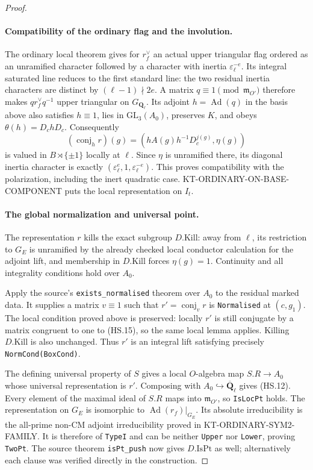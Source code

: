 \begin{proof}
\paragraph{Compatibility of the ordinary flag and the involution.}
The ordinary local theorem gives for $r_f^\vee$ an actual
upper triangular flag ordered as an unramified character
followed by a character with inertia
$\varepsilon_\ell^{-e}$.  Its integral saturated line
reduces to the first standard line: the two residual
inertia characters are distinct by
$(\ell-1)\nmid2e$.  A matrix $q\equiv1\pmod{\mathfrak m_{O'}}$
therefore makes $q r_f^\vee q^{-1}$ upper triangular
on $G_{\mathbf Q_\ell}$.  Its adjoint $h=\operatorname{Ad}(q)$
in the basis above also satisfies $h\equiv1$, lies in
$\mathrm{GL}_3(A_0)$, preserves $K$, and obeys
$\theta(h)=D_chD_c$.  Consequently
\[
 (\operatorname{conj}_h r)(g)
       =(hA(g)h^{-1}D_c^{j(g)},\eta(g))                     \tag{HS.15}
\]
is valued in $B\rtimes\{\pm1\}$ locally at $\ell$.
Since $\eta$ is unramified there, its diagonal inertia
character is exactly
$(\varepsilon_\ell^e,1,\varepsilon_\ell^{-e})$.
This proves compatibility with the polarization, including
the inert quadratic case.  KT-ORDINARY-ON-BASE-COMPONENT
puts the local representation on $I_t$.

\paragraph{The global normalization and universal point.}
The representation $r$ kills the exact subgroup
$D.\mathrm{Kill}$: away from $\ell$, its restriction to
$G_E$ is unramified by the already checked local conductor
calculation for the adjoint lift, and membership in
$D.\mathrm{Kill}$ forces $\eta(g)=1$.  Continuity and all
integrality conditions hold over $A_0$.

Apply the source's \texttt{exists\_normalised} theorem
over $A_0$ to the residual marked data.  It supplies a
matrix $v\equiv1$ such that $r'=\operatorname{conj}_v r$
is \texttt{Normalised} at $(c,g_1)$.  The local condition
proved above is preserved: locally $r'$ is still conjugate
by a matrix congruent to one to (HS.15), so the same local
lemma applies.  Killing $D.\mathrm{Kill}$ is also unchanged.
Thus $r'$ is an integral lift satisfying precisely
\texttt{NormCond(BoxCond)}.

The defining universal property of $S$ gives a local
$O$-algebra map $S.R\to A_0$ whose universal representation
is $r'$.  Composing with $A_0\hookrightarrow
\overline{\mathbf Q}_\ell$ gives (HS.12).
Every element of the maximal ideal of $S.R$ maps into
$\mathfrak m_{O'}$, so \texttt{IsLocPt} holds.
The representation on $G_E$ is isomorphic to
$\operatorname{Ad}(r_f)|_{G_E}$.  Its absolute
irreducibility is the all-prime non-CM adjoint
irreducibility proved in KT-ORDINARY-SYM2-FAMILY.
It is therefore of \texttt{TypeI} and can be neither
\texttt{Upper} nor \texttt{Lower}, proving \texttt{TwoPt}.
The source theorem \texttt{isPt\_push} now gives
$D.\mathrm{IsPt}$ as well; alternatively each clause was
verified directly in the construction.
\end{proof}

